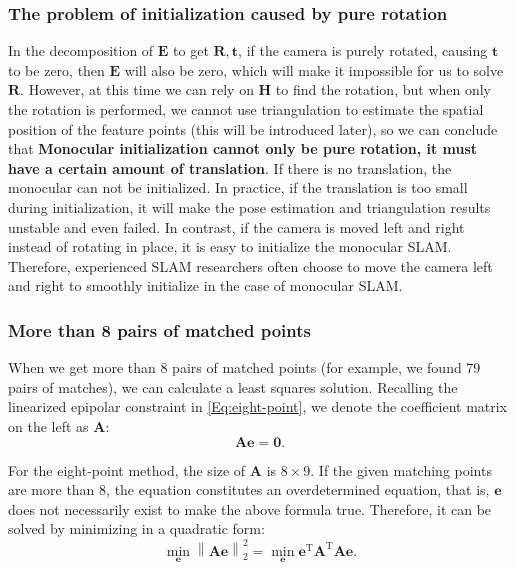 \subsubsection{The problem of initialization caused by pure rotation}
In the decomposition of $\mathbf{E}$ to get $\mathbf{R}, \mathbf{t}$, if the camera is purely rotated, causing $\mathbf{t}$ to be zero, then $\mathbf{E}$ will also be zero, which will make it impossible for us to solve $\mathbf{R}$. However, at this time we can rely on $\mathbf{H}$ to find the rotation, but when only the rotation is performed, we cannot use triangulation to estimate the spatial position of the feature points (this will be introduced later), so we can conclude that \textbf{Monocular initialization cannot only be pure rotation, it must have a certain amount of translation}. If there is no translation, the monocular can not be initialized. In practice, if the translation is too small during initialization, it will make the pose estimation and triangulation results unstable and even failed. In contrast, if the camera is moved left and right instead of rotating in place, it is easy to initialize the monocular SLAM. Therefore, experienced SLAM researchers often choose to move the camera left and right to smoothly initialize in the case of monocular SLAM.

\subsubsection{More than 8 pairs of matched points}
When we get more than 8 pairs of matched points (for example, we found 79 pairs of matches), we can calculate a least squares solution. Recalling the linearized epipolar constraint in \eqref{Eq:eight-point}, we denote the coefficient matrix on the left as $\mathbf{A}$:
\begin{equation}
\mathbf{A} \mathbf{e} = \mathbf{0} .
\end{equation}

For the eight-point method, the size of $\mathbf{A}$ is $8 \times 9$. If the given matching points are more than $8$, the equation constitutes an overdetermined equation, that is, $\mathbf{e}$ does not necessarily exist to make the above formula true. Therefore, it can be solved by minimizing in a quadratic form:
\begin{equation}
\mathop {\min }\limits_{\mathbf{e}} \left\| \mathbf{Ae} \right\|_2^2 = \mathop {\min }\limits_{\mathbf{e}} { \mathbf{e}^\mathrm{T}} {\mathbf{A}^\mathrm{T}} \mathbf{Ae}.
\end{equation}

